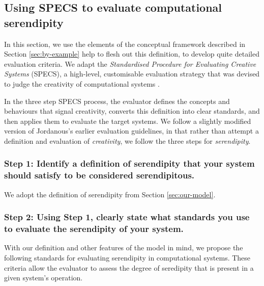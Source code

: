 \subsection{Using SPECS to evaluate computational serendipity}\label{specs-overview}

In this section, we use the elements of the conceptual framework
described in Section \ref{sec:by-example} help to flesh out this
definition, to develop quite detailed evaluation criteria.
We adapt the \emph{Standardised Procedure for Evaluating Creative Systems} (SPECS),
a high-level, customisable evaluation strategy that was devised to judge the creativity
of computational systems \cite{jordanous:12}.  

In the three step SPECS process, the evaluator defines the concepts
and behaviours that signal creativity, converts this definition into
clear standards, and then applies them to evaluate the target systems.
%
We follow a slightly modified version of Jordanous's earlier evaluation
guidelines, in that rather than attempt a definition and evaluation of
{\em creativity}, we follow the three steps for \emph{serendipity}.

\subsubsection*{Step 1: Identify a definition of serendipity that your system should satisfy to be considered serendipitous.}

\noindent We adopt the definition of serendipity from Section
\ref{sec:our-model}.

\subsubsection*{Step 2: Using Step 1, clearly state what standards you use to evaluate the serendipity of your system.}

\noindent With our definition and other features of the model in mind, we propose the following standards for evaluating serendipity in computational systems. These criteria allow the evaluator to assess the degree of seredipity that is present in a given system's operation.

